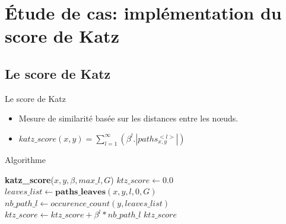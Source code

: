 \documentclass[10pt]{beamer}
\begin{document}
\section{Étude de cas: implémentation du score de Katz}
\subsection{Le score de Katz}
\begin{frame}
\begin{block}{Le score de Katz \cite{articlekatz,articledavidjon}}
    \begin{itemize}
     \item Mesure de similarité basée sur les distances entre les n\oe uds.
     \item $katz\_score(x,y) = \sum_{l=1}^{\infty}(\beta^{l}.|paths_{x,y}^{<l>}|)$
    \end{itemize}
    \end{block}
\begin{block}{Algorithme}
{\fontsize{10}{10}\selectfont
\begin{algorithmic}[1]
\STATE \textbf{katz\_score}($x,y,\beta,max\_l,G$)
\STATE $ktz\_score \leftarrow 0.0$
   \STATE \label{appel_paths_leaves}$leaves\_list \leftarrow \textbf{paths\_leaves}(x,y,l,0,G)$
   \STATE \label{appel_occurence_count} $nb\_path\_l \leftarrow occurence\_count(y, leaves\_list)$
   \STATE  $ktz\_score \leftarrow ktz\_score + \beta^l * nb\_path\_l$
\ENDFOR
\RETURN $ktz\_score$
\end{algorithmic}
}
\end{block}
\end{frame}
\end{document}
